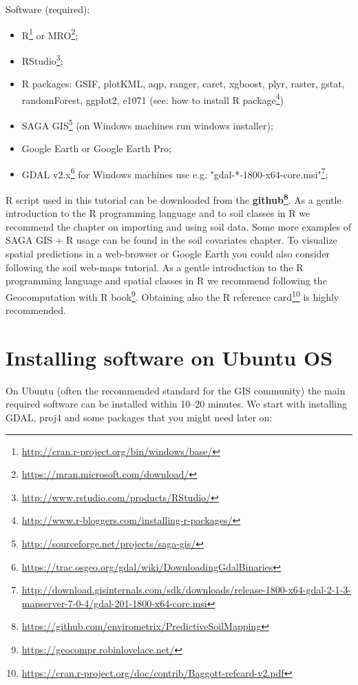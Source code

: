\documentclass[graybox,natbib,nospthms,UStrade]{svmono}
\renewcommand{\href}[2]{#2 (\url{#1})}
\renewcommand{\href}[2]{#2\footnote{\url{#1}}}
\begin{document}
Software (required):

\begin{itemize}
\item
  \href{http://cran.r-project.org/bin/windows/base/}{R} or \href{https://mran.microsoft.com/download/}{MRO};
\item
  \href{http://www.rstudio.com/products/RStudio/}{RStudio};
\item
  R packages: GSIF, plotKML, aqp, ranger, caret, xgboost, plyr, raster, gstat, randomForest, ggplot2, e1071 (see: \href{http://www.r-bloggers.com/installing-r-packages/}{how to install R package})
\item
  \href{http://sourceforge.net/projects/saga-gis/}{SAGA GIS} (on Windows machines run windows installer);
\item
  Google Earth or Google Earth Pro;
\item
  \href{https://trac.osgeo.org/gdal/wiki/DownloadingGdalBinaries}{GDAL v2.x} for Windows machines use e.g. \href{http://download.gisinternals.com/sdk/downloads/release-1800-x64-gdal-2-1-3-mapserver-7-0-4/gdal-201-1800-x64-core.msi}{"gdal-*-1800-x64-core.msi"};
\end{itemize}

R script used in this tutorial can be downloaded from the \textbf{\href{https://github.com/envirometrix/PredictiveSoilMapping}{github}}. As a gentle introduction to the R programming language and to soil classes in R we recommend the chapter on importing and using soil data. Some more examples of SAGA GIS + R usage can be found in the soil covariates chapter. To visualize spatial predictions in a web-browser or Google Earth you could also consider following the soil web-maps tutorial. As a gentle introduction to the R programming language and spatial classes in R we recommend following \href{https://geocompr.robinlovelace.net/}{the Geocomputation with R book}. Obtaining also the \href{https://cran.r-project.org/doc/contrib/Baggott-refcard-v2.pdf}{R reference card} is highly recommended.

\hypertarget{installing-software-on-ubuntu-os}{%
\section{Installing software on Ubuntu OS}\label{installing-software-on-ubuntu-os}}

On Ubuntu (often the recommended standard for the GIS community) the main required software can be installed within 10--20 minutes. We start with installing GDAL, proj4 and some packages that you might need later on:
\end{document}
